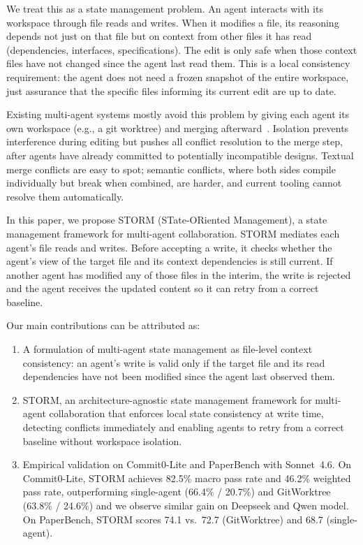 \documentclass{article}
\begin{document}
We treat this as a state management problem. An agent interacts with its workspace through file reads and writes. When it modifies a file, its reasoning depends not just on that file but on context from other files it has read (dependencies, interfaces, specifications). The edit is only safe when those context files have not changed since the agent last read them. This is a local consistency requirement: the agent does not need a frozen snapshot of the entire workspace, just assurance that the specific files informing its current edit are up to date. 

Existing multi-agent systems mostly avoid this problem by giving each agent its own workspace (e.g., a git worktree) and merging afterward~\citep{caid,coral,statsclaw}. Isolation prevents interference during editing but pushes all conflict resolution to the merge step, after agents have already committed to potentially incompatible designs. Textual merge conflicts are easy to spot; semantic conflicts, where both sides compile individually but break when combined, are harder, and current tooling cannot resolve them automatically.

In this paper, we propose STORM (STate-ORiented Management), a state management framework for multi-agent collaboration. STORM mediates each agent's file reads and writes. Before accepting a write, it checks whether the agent's view of the target file and its context dependencies is still current. If another agent has modified any of those files in the interim, the write is rejected and the agent receives the updated content so it can retry from a correct baseline. 


Our main contributions can be attributed as:
\begin{enumerate}
    \item A formulation of multi-agent state management as file-level context consistency: an agent's write is valid only if the target file and its read dependencies have not been modified since the agent last observed them.
    \item STORM, an architecture-agnostic state management framework for multi-agent collaboration that enforces local state consistency at write time, detecting conflicts immediately and enabling agents to retry from a correct baseline without workspace isolation.
    \item Empirical validation on Commit0-Lite\citep{commit0} and PaperBench\citep{PaperBench} with Sonnet~4.6. On Commit0-Lite, STORM achieves 82.5\% macro pass rate and 46.2\% weighted pass rate, outperforming single-agent (66.4\% / 20.7\%) and GitWorktree (63.8\% / 24.6\%) and we observe similar gain on Deepseek and Qwen model. On PaperBench, STORM scores 74.1 vs.\ 72.7 (GitWorktree) and 68.7 (single-agent).
\end{enumerate}
\end{document}
